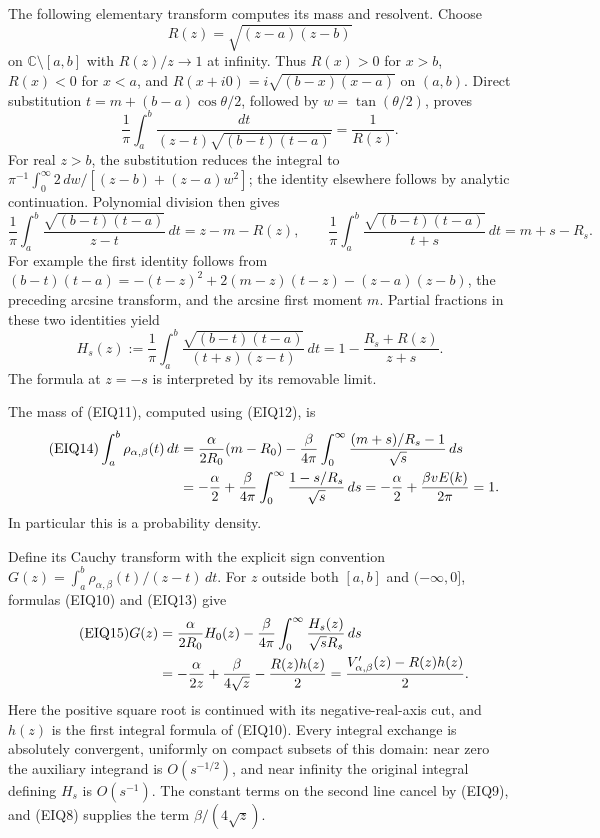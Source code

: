 \documentclass[11pt,a4paper]{article}
\begin{document}
The following elementary transform computes its mass and resolvent.
Choose \[R(z)=\sqrt{(z-a)(z-b)}\]
on $\mathbb C\setminus[a,b]$ with
$R(z)/z\to1$ at infinity. Thus $R(x)>0$ for $x>b$,
$R(x)<0$ for $x<a$, and $R(x+i0)=i\sqrt{(b-x)(x-a)}$ on $(a,b)$.
Direct substitution $t=m+(b-a)\cos\theta/2$, followed by
$w=\tan(\theta/2)$, proves
\[
 \frac1\pi\int_a^b\frac{dt}{(z-t)\sqrt{(b-t)(t-a)}}=\frac1{R(z)}.
\]
For real $z>b$, the substitution reduces the integral to
$\pi^{-1}\int_0^\infty2\,dw/[(z-b)+(z-a)w^2]$;
the identity elsewhere follows by analytic continuation.
Polynomial division then gives
\begin{equation}\tag{EIQ12}
 \frac1\pi\int_a^b\frac{\sqrt{(b-t)(t-a)}}{z-t}\,dt
     =z-m-R(z),\qquad
 \frac1\pi\int_a^b\frac{\sqrt{(b-t)(t-a)}}{t+s}\,dt
     =m+s-R_s.
\end{equation}
For example the first identity follows from
$(b-t)(t-a)=-(t-z)^2+2(m-z)(t-z)-(z-a)(z-b)$,
the preceding arcsine transform, and the arcsine first moment $m$.
Partial fractions in these two identities yield
\begin{equation}\tag{EIQ13}
 H_s(z):=\frac1\pi\int_a^b
       \frac{\sqrt{(b-t)(t-a)}}{(t+s)(z-t)}\,dt
       =1-\frac{R_s+R(z)}{z+s}.
\end{equation}
The formula at $z=-s$ is interpreted by its removable limit.

The mass of (EIQ11), computed using (EIQ12), is
\begin{align}\tag{EIQ14}
 \int_a^b\rho_{\alpha,\beta}(t)\,dt
 &=\frac\alpha{2R_0}(m-R_0)
 -\frac\beta{4\pi}\int_0^\infty
       \frac{(m+s)/R_s-1}{\sqrt s}\,ds\\
 &=-\frac\alpha2+
   \frac\beta{4\pi}\int_0^\infty\frac{1-s/R_s}{\sqrt s}\,ds
 =-\frac\alpha2+\frac{\beta vE(k)}{2\pi}=1.\notag
\end{align}
In particular this is a probability density.

Define its Cauchy transform with the explicit sign convention
$G(z)=\int_a^b\rho_{\alpha,\beta}(t)/(z-t)\,dt$.
For $z$ outside both $[a,b]$ and $(-\infty,0]$, formulas (EIQ10) and
(EIQ13) give
\begin{align}\tag{EIQ15}
 G(z)
 &=\frac\alpha{2R_0}H_0(z)
       -\frac\beta{4\pi}
          \int_0^\infty\frac{H_s(z)}{\sqrt sR_s}\,ds\\
 &=-\frac\alpha{2z}+\frac\beta{4\sqrt z}
       -\frac{R(z)h(z)}2
 =\frac{V'_{\alpha,\beta}(z)-R(z)h(z)}2.\notag
\end{align}
Here the positive square root is continued with its negative-real-axis
cut, and $h(z)$ is the first integral formula of (EIQ10).  Every integral
exchange is absolutely convergent, uniformly on compact subsets of this
domain: near zero the auxiliary integrand is $O(s^{-1/2})$, and near
infinity the original integral defining $H_s$ is $O(s^{-1})$.
The constant terms on the second line cancel by (EIQ9), and (EIQ8)
supplies the term $\beta/(4\sqrt z)$.
\end{document}
